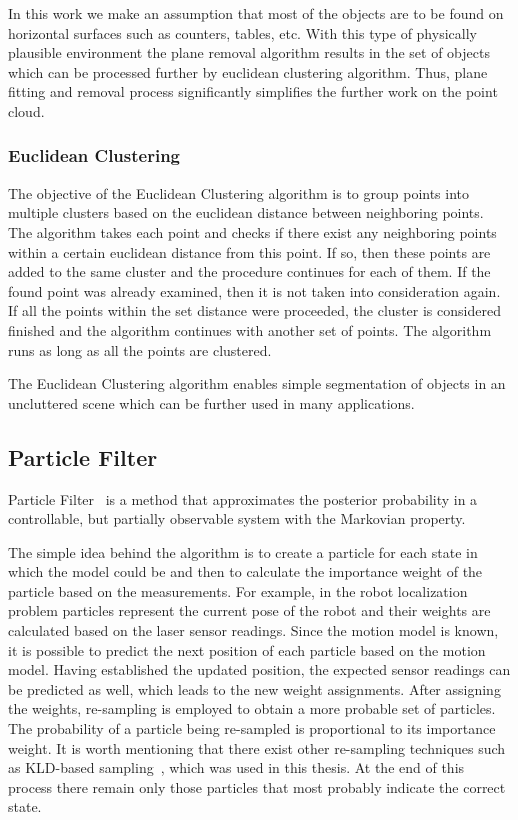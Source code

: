 In this work we make an assumption that most of the 
objects are to be found on horizontal surfaces such as counters, tables, etc. With this type of physically plausible environment the plane removal algorithm results in the set of objects which can be processed further by euclidean clustering algorithm. Thus, plane fitting and removal process significantly simplifies the further work on the point cloud.



\subsubsection{Euclidean Clustering}
The objective of the Euclidean Clustering algorithm is to group points into multiple clusters based on the euclidean distance between neighboring points. The algorithm takes each point and checks if there exist any neighboring points within a certain euclidean distance from this point. If so, then these points are added to the same cluster and the procedure continues for each of them. If the found point was already examined, then it is not taken into consideration again. If all the points within the set distance were proceeded, the cluster is considered finished and the algorithm continues with another set of points. The algorithm runs as long as all the points are clustered. 

The Euclidean Clustering algorithm enables simple segmentation of objects in an uncluttered scene which can be further used in many applications.   

\subsection{Particle Filter}
Particle Filter~\cite{Thrun02d} is a method that approximates the posterior probability in a controllable, but partially observable system with the Markovian property. 

The simple idea behind the algorithm is to create a particle for each state in which the model could be and then to calculate the importance weight of the particle based on the measurements. For example, in the robot localization problem particles represent the current pose of the robot and their weights are calculated based on the laser sensor readings. Since the motion model is known, it is possible to predict the next position of each particle based on the motion model. Having established the updated position, the expected sensor readings can be predicted as well, which leads to the new weight assignments. After assigning the weights, re-sampling is employed to obtain a more probable set of particles. The probability of a particle being re-sampled is proportional to its importance weight. It is worth mentioning that there exist other re-sampling techniques such as KLD-based sampling~\cite{Fox01KLD}, which was used in this thesis.  At the end of this process there remain only those particles that most probably indicate the correct state.

